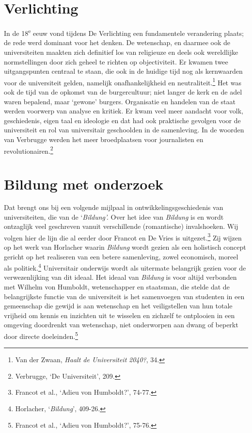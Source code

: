 \documentclass[smallauthor, chapterhaspagenum, nochapterinheader, pagenuminheader,  bigchapnum,medium2, tocpages, garamond, titleinheader]{jote-book}
\begin{document}
	\section{Verlichting}



	In de 18\textsuperscript{e} eeuw vond tijdens De Verlichting een fundamentele verandering plaats; de rede werd dominant voor het denken. De wetenschap, en daarmee ook de universiteiten maakten zich definitief los van religieuze en deels ook wereldlijke normstellingen door zich geheel te richten op objectiviteit. Er kwamen twee uitgangspunten centraal te staan, die ook in de huidige tijd nog als kernwaarden voor de universiteit gelden, namelijk onafhankelijkheid en neutraliteit.\footnote{Van der Zwaan, \emph{Haalt de Universiteit }\emph{2040?}, 34.} Het was ook de tijd van de opkomst van de burgercultuur; niet langer de kerk en de adel waren bepalend, maar ‘gewone' burgers. Organisatie en handelen van de staat werden voorwerp van analyse en kritiek. Er kwam veel meer aandacht voor volk, geschiedenis, eigen taal en ideologie en dat had ook praktische gevolgen voor de universiteit en rol van universitair geschoolden in de samenleving. In de woorden van Verbrugge werden het meer broedplaatsen voor journalisten en revolutionairen.\footnote{Verbrugge, ‘De Universiteit', 209.}



	\section{Bildung met onderzoek}



	Dat brengt ons bij een volgende mijlpaal in ontwikkelingsgeschiedenis van universiteiten, die van de ‘\emph{Bildung}\emph{'}\emph{. }Over het idee van \emph{Bildung} is en wordt ontzaglijk veel geschreven vanuit verschillende (romantische) invalshoeken. Wij volgen hier de lijn die al eerder door Francot en De Vries is uitgezet.\footnote{Francot et al., ‘Adieu von Humboldt?', 74-77.} Zij wijzen op het werk van Horlacher waarin \emph{Bildung} wordt gezien als een holistisch concept gericht op het realiseren van een betere samenleving, zowel economisch, moreel als politiek.\footnote{Horlacher, ‘\emph{Bildung}', 409-26.} Universitair onderwijs wordt als uitermate belangrijk gezien voor de verwezenlijking van dit ideaal. Het ideaal van \emph{Bildung} is voor altijd verbonden met Wilhelm von Humboldt, wetenschapper en staatsman, die stelde dat de belangrijkste functie van de universiteit is het samenvoegen van studenten in een gemeenschap die gewijd is aan wetenschap en het veiligstellen van hun totale vrijheid om kennis en inzichten uit te wisselen en zichzelf te ontplooien in een omgeving doordrenkt van wetenschap, niet onderworpen aan dwang of beperkt door directe doeleinden.\footnote{Francot et al., ‘Adieu von Humboldt?', 75-76.}
\end{document}

